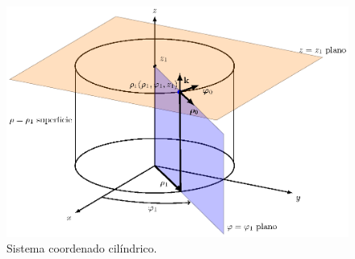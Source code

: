 \begin{figure}[H]
    \centering
    \includegraphics[scale=1]{Imagenes/Sistema_Cilindrico_01.eps}
    \caption{Sistema coordenado cilíndrico.}
    \label{fig:figura_sistema_01_cilindrico}
\end{figure}

